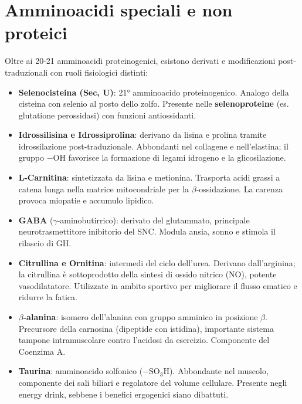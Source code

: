 \documentclass[12pt,a4paper]{report}
\begin{document}
\section{Amminoacidi speciali e non proteici}
Oltre ai 20-21 amminoacidi proteinogenici, esistono derivati e modificazioni post-traduzionali con ruoli fisiologici distinti:
\begin{itemize}
\item \textbf{Selenocisteina (Sec, U)}: 21° amminoacido proteinogenico. Analogo della cisteina con selenio al posto dello zolfo. Presente nelle \textbf{selenoproteine} (es. glutatione perossidasi) con funzioni antiossidanti.
\item \textbf{Idrossilisina e Idrossiprolina}: derivano da lisina e prolina tramite idrossilazione post-traduzionale. Abbondanti nel collagene e nell'elastina; il gruppo \(-\mathrm{OH}\) favorisce la formazione di legami idrogeno e la glicosilazione.
\item \textbf{L-Carnitina}: sintetizzata da lisina e metionina. Trasporta acidi grassi a catena lunga nella matrice mitocondriale per la \(\beta\)-ossidazione. La carenza provoca miopatie e accumulo lipidico.
\item \textbf{GABA} (\(\gamma\)-aminobutirrico): derivato del glutammato, principale neurotrasmettitore inibitorio del SNC. Modula ansia, sonno e stimola il rilascio di GH.
\item \textbf{Citrullina e Ornitina}: intermedi del ciclo dell'urea. Derivano dall'arginina; la citrullina è sottoprodotto della sintesi di ossido nitrico (NO), potente vasodilatatore. Utilizzate in ambito sportivo per migliorare il flusso ematico e ridurre la fatica.
\item \textbf{\(\beta\)-alanina}: isomero dell'alanina con gruppo amminico in posizione \(\beta\). Precursore della carnosina (dipeptide con istidina), importante sistema tampone intramuscolare contro l'acidosi da esercizio. Componente del Coenzima A.
\item \textbf{Taurina}: amminoacido solfonico (\(-\mathrm{SO_3H}\)). Abbondante nel muscolo, componente dei sali biliari e regolatore del volume cellulare. Presente negli energy drink, sebbene i benefici ergogenici siano dibattuti.
\end{itemize}

\end{document}
